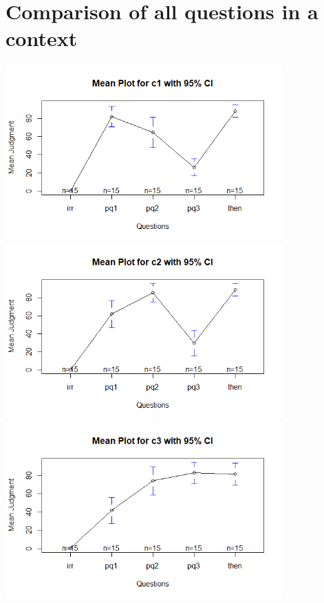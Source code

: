 \index{}\documentclass[a4paper, 11pt, fleqn, leqno ]{article}
\begin{document}
\section{Comparison of all questions in a context}\vspace{-2ex}
\includegraphics[width=0.8\textwidth]{means_c1.png}\\
\includegraphics[width=0.8\textwidth]{means_c2.png}\\
\includegraphics[width=0.8\textwidth]{means_c3.png}

%
\end{document}
